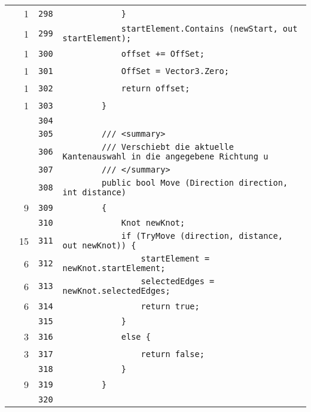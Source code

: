 \documentclass[a4paper,10pt]{article}
\begin{document}
\begin{longtable}[l]{lrrl}
\cellcolor{green} & 1 & \verb~298~ & \verb~            }~\\
\cellcolor{green} & 1 & \verb~299~ & \verb~            startElement.Contains (newStart, out startElement);~\\
\cellcolor{green} & 1 & \verb~300~ & \verb~            offset += OffSet;~\\
\cellcolor{green} & 1 & \verb~301~ & \verb~            OffSet = Vector3.Zero;~\\
\cellcolor{green} & 1 & \verb~302~ & \verb~            return offset;~\\
\cellcolor{green} & 1 & \verb~303~ & \verb~        }~\\
\cellcolor{gray} &  & \verb~304~ & \verb~~\\
\cellcolor{gray} &  & \verb~305~ & \verb~        /// <summary>~\\
\cellcolor{gray} &  & \verb~306~ & \verb~        /// Verschiebt die aktuelle Kantenauswahl in die angegebene Richtung u~\\
\cellcolor{gray} &  & \verb~307~ & \verb~        /// </summary>~\\
\cellcolor{gray} &  & \verb~308~ & \verb~        public bool Move (Direction direction, int distance)~\\
\cellcolor{green} & 9 & \verb~309~ & \verb~        {~\\
\cellcolor{gray} &  & \verb~310~ & \verb~            Knot newKnot;~\\
\cellcolor{green} & 15 & \verb~311~ & \verb~            if (TryMove (direction, distance, out newKnot)) {~\\
\cellcolor{green} & 6 & \verb~312~ & \verb~                startElement = newKnot.startElement;~\\
\cellcolor{green} & 6 & \verb~313~ & \verb~                selectedEdges = newKnot.selectedEdges;~\\
\cellcolor{green} & 6 & \verb~314~ & \verb~                return true;~\\
\cellcolor{gray} &  & \verb~315~ & \verb~            }~\\
\cellcolor{green} & 3 & \verb~316~ & \verb~            else {~\\
\cellcolor{green} & 3 & \verb~317~ & \verb~                return false;~\\
\cellcolor{gray} &  & \verb~318~ & \verb~            }~\\
\cellcolor{green} & 9 & \verb~319~ & \verb~        }~\\
\cellcolor{gray} &  & \verb~320~ & \verb~~\\

\end{longtable}
\end{document}
